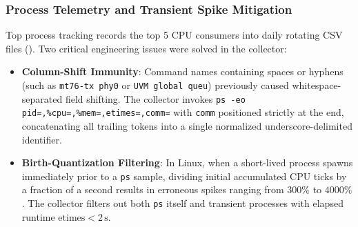\subsubsection{Process Telemetry and Transient Spike Mitigation}
Top process tracking records the top 5 CPU consumers into daily rotating CSV files (). Two critical engineering issues were solved in the collector:
\begin{itemize}
    \item \textbf{Column-Shift Immunity}: Command names containing spaces or hyphens (such as \texttt{mt76-tx phy0} or \texttt{UVM global queu}) previously caused whitespace-separated field shifting. The collector invokes \texttt{ps -eo pid=,\%cpu=,\%mem=,etimes=,comm=} with \texttt{comm} positioned strictly at the end, concatenating all trailing tokens into a single normalized underscore-delimited identifier.
    \item \textbf{Birth-Quantization Filtering}: In Linux, when a short-lived process spawns immediately prior to a \texttt{ps} sample, dividing initial accumulated CPU ticks by a fraction of a second results in erroneous spikes ranging from $300\%$ to $4000\%$. The collector filters out both \texttt{ps} itself and transient processes with elapsed runtime $\text{etimes} < 2\,\text{s}$.
\end{itemize}

